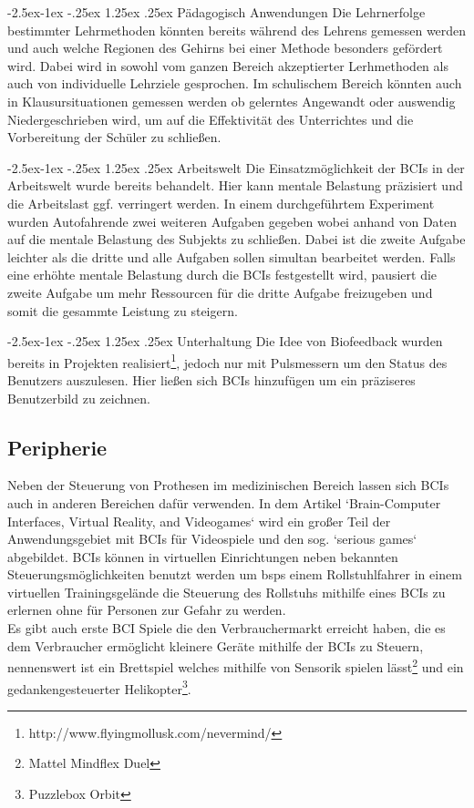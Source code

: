 \documentclass[11pt,ngerman,parskip=half]{scrartcl}
\makeatletter
\renewcommand\paragraph{\@startsection{paragraph}{4}{\z@}%
            {-2.5ex\@plus -1ex \@minus -.25ex}%
            {1.25ex \@plus .25ex}%
            {\normalfont\normalsize\bfseries}}
\makeatother
\begin{document}
\paragraph{Pädagogisch Anwendungen}
Die Lehrnerfolge bestimmter Lehrmethoden könnten bereits während des Lehrens
gemessen werden und auch welche Regionen des Gehirns bei einer Methode
besonders gefördert wird. Dabei wird in \parencite{beyond} sowohl vom ganzen
Bereich akzeptierter Lerhmethoden als auch von individuelle Lehrziele
gesprochen. Im schulischem Bereich könnten auch in Klausursituationen
gemessen werden ob gelerntes Angewandt oder auswendig Niedergeschrieben wird,
um auf die Effektivität des Unterrichtes und die Vorbereitung der Schüler zu
schließen.

\paragraph{Arbeitswelt}
Die Einsatzmöglichkeit der BCIs in der Arbeitswelt wurde bereits
behandelt\parencite{beyond,workload}. Hier kann mentale Belastung präzisiert
und die Arbeitslast ggf. verringert werden. In einem durchgeführtem
Experiment\parencite[24.3]{workload} wurden Autofahrende zwei weiteren
Aufgaben gegeben wobei anhand von Daten auf die mentale Belastung des
Subjekts zu schließen. Dabei ist die zweite Aufgabe leichter als die dritte
und alle Aufgaben sollen simultan bearbeitet werden. Falls eine erhöhte
mentale Belastung durch die BCIs festgestellt wird, pausiert die zweite
Aufgabe um mehr Ressourcen für die dritte Aufgabe freizugeben und somit die
gesammte Leistung zu steigern.

\paragraph{Unterhaltung}
 Die Idee von Biofeedback wurden bereits in Projekten
 realisiert\footnote{http://www.flyingmollusk.com/nevermind/}, jedoch nur mit
 Pulsmessern um den Status des Benutzers auszulesen. Hier ließen sich BCIs
 hinzufügen um ein präziseres Benutzerbild zu zeichnen.

\subsection{Peripherie}
Neben der Steuerung von Prothesen im medizinischen Bereich lassen sich BCIs
auch in anderen Bereichen dafür verwenden. In dem Artikel `Brain-Computer
Interfaces, Virtual Reality, and Videogames`\parencite{vidya} wird ein großer
Teil der Anwendungsgebiet mit BCIs für Videospiele und den sog. `serious
games` abgebildet. BCIs können in virtuellen Einrichtungen neben bekannten
Steuerungsmöglichkeiten benutzt werden um bsps einem Rollstuhlfahrer in einem
virtuellen Trainingsgelände die Steuerung des Rollstuhs mithilfe eines BCIs
zu erlernen ohne für Personen zur Gefahr zu werden\parencite[S.3
ff.]{vidya}.\\ Es gibt auch erste BCI Spiele die den Verbrauchermarkt
erreicht haben, die es dem Verbraucher ermöglicht kleinere Geräte mithilfe
der BCIs zu Steuern, nennenswert ist ein Brettspiel welches mithilfe von
Sensorik spielen lässt\footnote{Mattel Mindflex Duel} und ein
gedankengesteuerter Helikopter\footnote{Puzzlebox Orbit}.
\end{document}
